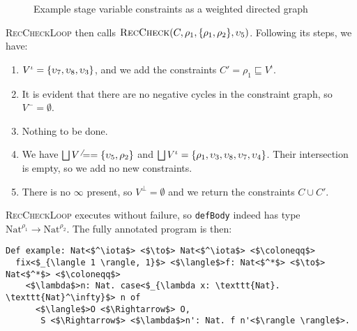 \documentclass[nonacm,screen,10pt]{acmart}
\begin{document}
\begin{figure}
    \centering
{}
\caption{Example stage variable constraints as a weighted directed graph}
\label{fig:digraph}
\end{figure}

\textsc{RecCheckLoop} then calls $\textsc{RecCheck}(C, \rho_1, \{\rho_1, \rho_2\}, \upsilon_5)$. Following its steps, we have:
\begin{enumerate}
    \item $V^\iota = \{\upsilon_7, \upsilon_8, \upsilon_3\}$, and we add the constraints $C' = \rho_1 \sqsubseteq V^\iota$.
    \item It is evident that there are no negative cycles in the constraint graph, so $V^- = \emptyset$.
    \item Nothing to be done.
    \item We have $\bigsqcup V^\neq = \{\upsilon_5, \rho_2\}$ and $\bigsqcup V^\iota = \{\rho_1, \upsilon_3, \upsilon_8, \upsilon_7, \upsilon_4\}$. Their intersection is empty, so we add no new constraints.
    \item There is no $\infty$ present, so $V^\bot = \emptyset$ and we return the constraints $C \cup C'$.
\end{enumerate}

\textsc{RecCheckLoop} executes without failure, so \texttt{defBody} indeed has type $\text{Nat}^{\rho_1} \to \text{Nat}^{\rho_2}$. The fully annotated program is then:

\begin{verbatim}
Def example: Nat<$^\iota$> <$\to$> Nat<$^\iota$> <$\coloneqq$>
  fix<$_{\langle 1 \rangle, 1}$> <$\langle$>f: Nat<$^*$> <$\to$> Nat<$^*$> <$\coloneqq$>
    <$\lambda$>n: Nat. case<$_{\lambda x: \texttt{Nat}. \texttt{Nat}^\infty}$> n of
      <$\langle$>O <$\Rightarrow$> O,
       S <$\Rightarrow$> <$\lambda$>n': Nat. f n'<$\rangle \rangle$>.
\end{verbatim}
\end{document}
